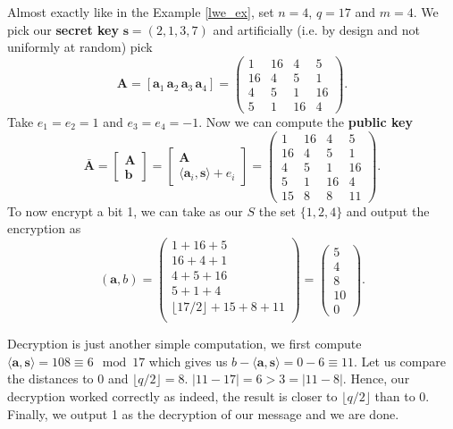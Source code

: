 \begin{example}
    Almost exactly like in the Example \ref{lwe_ex}, set $n = 4$, $q=17$ and $m=4$. We pick our \textbf{secret key} $\bm{s} = (2,1,3,7)$ and artificially (i.e. by design and not uniformly at random) pick
    \[ \bm{A} = [\bm{a}_1 \, \bm{a}_2 \, \bm{a}_3 \, \bm{a}_4] = 
	\begin{pmatrix}1 & 16 & 4 & 5\\
	    		16 & 4 & 5 & 1 \\
			4 & 5 & 1 & 16 \\
			5 & 1 & 16 & 4
	\end{pmatrix}. \]
	Take $e_1 = e_2 = 1$ and $e_3 = e_4 = -1$. Now we can compute the \textbf{public key} 
	\[ \bar{\bm{A}} = \begin{bmatrix} \bm{A} \\ \bm{b} \end{bmatrix} = 
	\begin{bmatrix} \bm{A} \\ \langle \bm{a}_i, \bm{s} \rangle + e_i \end{bmatrix}  = 
	\begin{pmatrix} 1 & 16 & 4 & 5 \\
	    16 & 4 & 5 & 1 \\
	    4 & 5 & 1 & 16 \\
	    5 & 1 & 16 & 4 \\
	    15 & 8 & 8 & 11
	\end{pmatrix}.
	\]
    To now encrypt a bit 1, we can take as our $S$ the set $\{1,2,4\}$ and output the encryption as
     \[(\bm{a}, b) = \begin{pmatrix} 1 + 16 + 5\\ 
		16 + 4 + 1\\
		4 + 5 + 16 \\
		5 + 1 + 4 \\
		\lfloor 17/2 \rfloor + 15 + 8 + 11 \\
		\end{pmatrix} = \begin{pmatrix} 5 \\ 4 \\ 8 \\ 10 \\ 0  \end{pmatrix}.
	    \]

	    Decryption is just another simple computation, we first compute $\langle \bm{a}, \bm{s} \rangle = 108 \equiv 6 \mod 17$ which gives us $b - \langle \bm{a}, \bm{s} \rangle = 0 - 6 \equiv 11$. Let us compare the distances to 0 and $\lfloor q/2 \rfloor = 8$. $|11 - 17| = 6 > 3 = |11 - 8|$. Hence, our decryption worked correctly as indeed, the result is closer to $\lfloor q/2 \rfloor$ than to 0. Finally, we output 1 as the decryption of our message and we are done.


\end{example}

